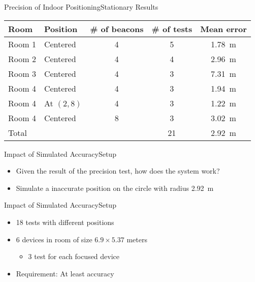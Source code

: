 \begin{frame}{Precision of Indoor Positioning}{Stationary Results}
  \centering
  \begin{tabular}{l|l c c c}
  	Room   & Position   & \# of beacons & \# of tests & Mean error        \\ \hline
  	Room 1 & Centered   & \num{4}       & 5           & \SI{1.78}{\meter} \\
  	Room 2 & Centered   & \num{4}       & 4           & \SI{2.96}{\meter} \\
  	Room 3 & Centered   & \num{4}       & 3           & \SI{7.31}{\meter} \\
  	Room 4 & Centered   & \num{4}       & 3           & \SI{1.94}{\meter} \\
  	Room 4 & At $(2,8)$ & \num{4}       & 3           & \SI{1.22}{\meter} \\
  	Room 4 & Centered   & \num{8}       & 3           & \SI{3.02}{\meter} \\ \hline
  	Total  &            &               & 21          & \SI{2.92}{\meter}
  \end{tabular}
\end{frame}

\begin{frame}{Impact of Simulated Accuracy}{Setup}
  \begin{itemize}
    \item Given the result of the precision test, how does the system work?
    \item Simulate a inaccurate position on the circle with radius \SI{2.92}{\meter}
  \end{itemize}
  \begin{center}
  \end{center}
\end{frame}

\begin{frame}{Impact of Simulated Accuracy}{Setup}
  \begin{itemize}
    \item 18 tests with different positions
    \item 6 devices in room of size $6.9 \times 5.37$ meters
    \begin{itemize}
      \item 3 test for each focused device
    \end{itemize}
    \item Requirement: At least  accuracy
  \end{itemize}
\end{frame}

